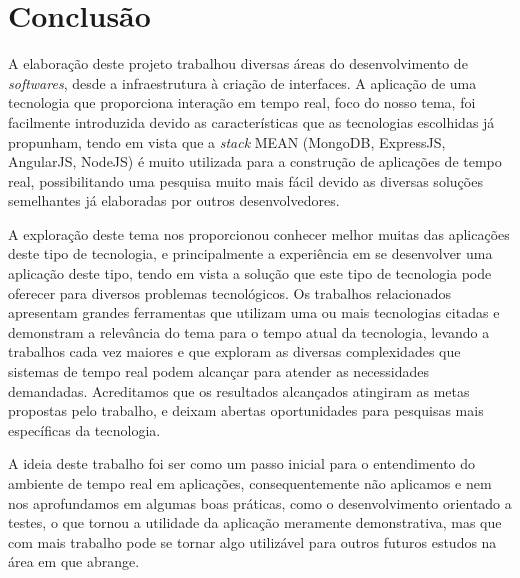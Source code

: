 \chapter{Conclusão}
A elaboração deste projeto trabalhou diversas áreas do desenvolvimento de \textit{softwares}, desde a infraestrutura à criação de interfaces. A aplicação de uma tecnologia que proporciona interação em tempo real, foco do nosso tema, foi facilmente introduzida devido as características que as tecnologias escolhidas já propunham, tendo em vista que a \textit{stack} MEAN (MongoDB, ExpressJS, AngularJS, NodeJS) é muito utilizada para a construção de aplicações de tempo real, possibilitando uma pesquisa muito mais fácil devido as diversas soluções semelhantes já elaboradas por outros desenvolvedores.

A exploração deste tema nos proporcionou conhecer melhor muitas das aplicações deste tipo de tecnologia, e principalmente a experiência em se desenvolver uma aplicação deste tipo, tendo em vista a solução que este tipo de tecnologia pode oferecer para diversos problemas tecnológicos. Os trabalhos relacionados apresentam grandes ferramentas que utilizam uma ou mais tecnologias citadas e demonstram a relevância do tema para o tempo atual da tecnologia, levando a trabalhos cada vez maiores e que exploram as diversas complexidades que sistemas de tempo real podem alcançar para atender as necessidades demandadas. Acreditamos que os resultados alcançados atingiram as metas propostas pelo trabalho, e deixam abertas oportunidades para pesquisas mais específicas da tecnologia.

A ideia deste trabalho foi ser como um passo inicial para o entendimento do ambiente de tempo real em aplicações, consequentemente não aplicamos e nem nos aprofundamos em algumas boas práticas, como o desenvolvimento orientado a testes, o que tornou a utilidade da aplicação meramente demonstrativa, mas que com mais trabalho pode se tornar algo utilizável para outros futuros estudos na área em que abrange.



